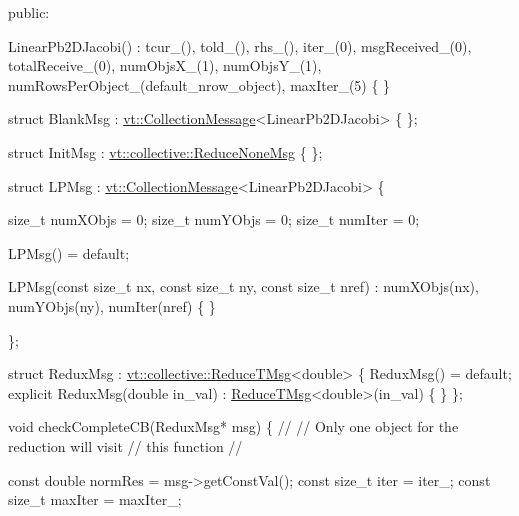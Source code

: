 \begin{DoxyCodeInclude}
\textcolor{keyword}{public}:

  LinearPb2DJacobi()
    : tcur\_(), told\_(), rhs\_(), iter\_(0),
      msgReceived\_(0), totalReceive\_(0),
      numObjsX\_(1), numObjsY\_(1),
      numRowsPerObject\_(default\_nrow\_object),
      maxIter\_(5)
  \{ \}


  \textcolor{keyword}{struct }BlankMsg : \hyperlink{structvt_1_1vrt_1_1collection_1_1_collection_message}{vt::CollectionMessage}<LinearPb2DJacobi> \{ \};

  \textcolor{keyword}{struct }InitMsg : \hyperlink{structvt_1_1collective_1_1reduce_1_1operators_1_1_reduce_t_msg}{vt::collective::ReduceNoneMsg} \{ \};

  \textcolor{keyword}{struct }LPMsg : \hyperlink{structvt_1_1vrt_1_1collection_1_1_collection_message}{vt::CollectionMessage}<LinearPb2DJacobi> \{

    \textcolor{keywordtype}{size\_t} numXObjs = 0;
    \textcolor{keywordtype}{size\_t} numYObjs = 0;
    \textcolor{keywordtype}{size\_t} numIter = 0;

    LPMsg() = \textcolor{keywordflow}{default};

    LPMsg(\textcolor{keyword}{const} \textcolor{keywordtype}{size\_t} nx, \textcolor{keyword}{const} \textcolor{keywordtype}{size\_t} ny, \textcolor{keyword}{const} \textcolor{keywordtype}{size\_t} nref)
      : numXObjs(nx), numYObjs(ny), numIter(nref)
    \{ \}

  \};


  \textcolor{keyword}{struct }ReduxMsg : \hyperlink{structvt_1_1collective_1_1reduce_1_1operators_1_1_reduce_t_msg}{vt::collective::ReduceTMsg}<double> \{
    ReduxMsg() = \textcolor{keywordflow}{default};
    \textcolor{keyword}{explicit} ReduxMsg(\textcolor{keywordtype}{double} in\_val) : \hyperlink{namespacevt_1_1collective_a28b82d5d48c9bc6e4fd738fcbf9e0f62}{ReduceTMsg}<double>(in\_val) \{ \}
  \};


  \textcolor{keywordtype}{void} checkCompleteCB(ReduxMsg* msg) \{
    \textcolor{comment}{//}
    \textcolor{comment}{// Only one object for the reduction will visit}
    \textcolor{comment}{// this function}
    \textcolor{comment}{//}

    \textcolor{keyword}{const} \textcolor{keywordtype}{double} normRes = msg->getConstVal();
    \textcolor{keyword}{const} \textcolor{keywordtype}{size\_t} iter = iter\_;
    \textcolor{keyword}{const} \textcolor{keywordtype}{size\_t} maxIter = maxIter\_;


\end{DoxyCodeInclude}
